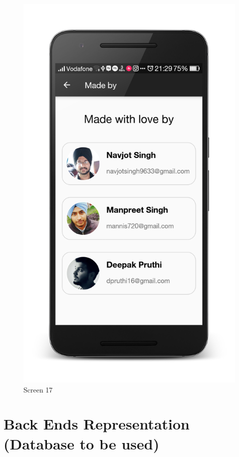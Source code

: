 \newpage
\begin{figure}[ht]
\centering
\includegraphics[scale=0.13]{images/d2.png}
\caption{Screen 17}
\end{figure}



\section{Back Ends Representation (Database to be used)}
